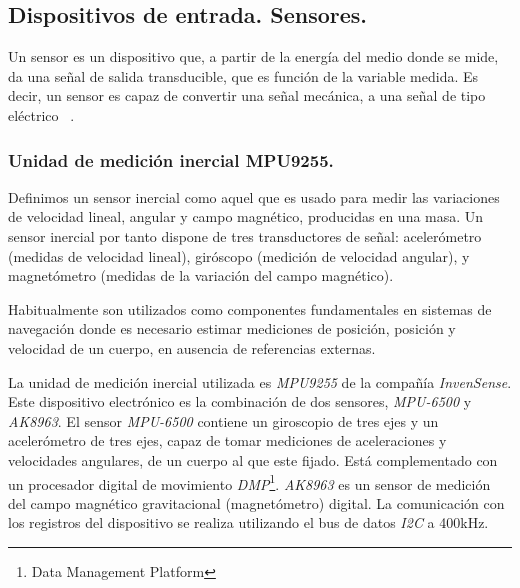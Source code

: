 \subsection{Dispositivos de entrada. Sensores.}
Un sensor es un dispositivo que, a partir de la energía del medio donde se mide, da una señal de salida transducible, que es función de la variable medida. Es decir, un sensor es capaz de convertir una señal mecánica, a una señal de tipo eléctrico ~\cite{Payas}. 



\subsubsection{Unidad de medición inercial MPU9255.}

Definimos un sensor inercial como aquel que es usado para medir las variaciones de velocidad lineal, angular y campo magnético, producidas en una masa.
Un sensor inercial por tanto dispone de tres transductores de señal: acelerómetro (medidas de velocidad lineal), giróscopo (medición de velocidad angular), y magnetómetro (medidas de la variación del campo magnético).

Habitualmente son utilizados como componentes fundamentales en sistemas de navegación donde es necesario estimar mediciones de posición, posición y velocidad de un cuerpo, en ausencia de referencias externas.

La unidad de medición inercial utilizada es \emph{MPU9255} de la compañía \emph{InvenSense}. Este dispositivo electrónico es la combinación de dos sensores, \emph{MPU-6500} y \emph{AK8963}. El sensor \emph{MPU-6500} contiene un giroscopio de tres ejes y un acelerómetro de tres ejes, capaz de tomar mediciones de aceleraciones y velocidades angulares, de un cuerpo al que este fijado. Está complementado con un procesador digital de movimiento \emph{DMP}\footnote{Data Management Platform}. \emph{AK8963} es un sensor de medición del campo magnético gravitacional (magnetómetro) digital. La comunicación con los registros del dispositivo se realiza utilizando el bus de datos \emph{I2C} a 400kHz.\\

